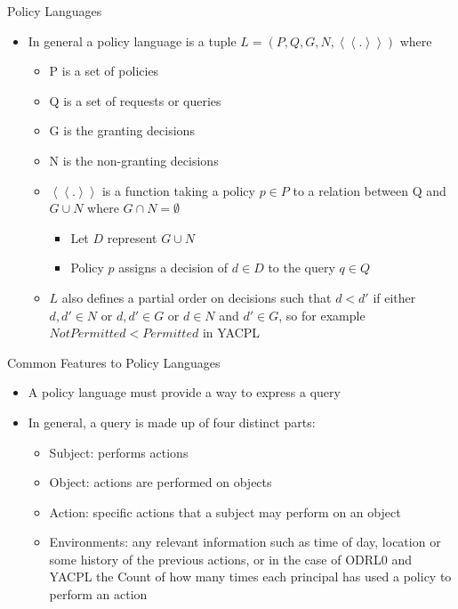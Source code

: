\documentclass{beamer}
\begin{document}
\begin{frame}[fragile]{Policy Languages}
\begin{itemize}
\item In general a policy language is a tuple $L = (P, Q, G, N, \left\langle\left\langle . \right\rangle\right\rangle)$ where
    \begin{itemize}
        \item P is a set of policies
        \item Q is a set of requests or queries
        \item G is the granting decisions
         \item N is the non-granting decisions
         \item $\left\langle\left\langle . \right\rangle\right\rangle$ is a function taking a policy $p \in P$ to a relation between Q and $G \cup N$ where $G \cap N = \emptyset$
               \begin{itemize}
                    \item Let $D$ represent $G \cup N$ 
                    \item Policy $p$ assigns a decision of $d \in D$ to the query $q \in Q$
                \end{itemize}
          \item $L$ also defines a partial order on decisions such that $d < d'$ if either $d, d' \in N$ or $d, d' \in G$ or $d \in N$ and $d' \in G$, so for example $NotPermitted < Permitted$ in YACPL
    \end{itemize}
\end{itemize}
\end{frame}
\begin{frame}[fragile]{Common Features to Policy Languages}
\begin{itemize}
\item A policy language must provide a way to express a query
\item In general, a query is made up of four distinct parts:
   \begin{itemize}
       \item Subject: performs actions
       \item Object: actions are performed on objects
       \item Action: specific actions that a subject may perform on an object
       \item Environments: any relevant information such as time of day, location or some history of the previous actions, or in the case of ODRL0 and YACPL the Count of how many times each principal has used a policy to perform an action
       \end{itemize}
\end{itemize}
\end{frame}
\end{document}
